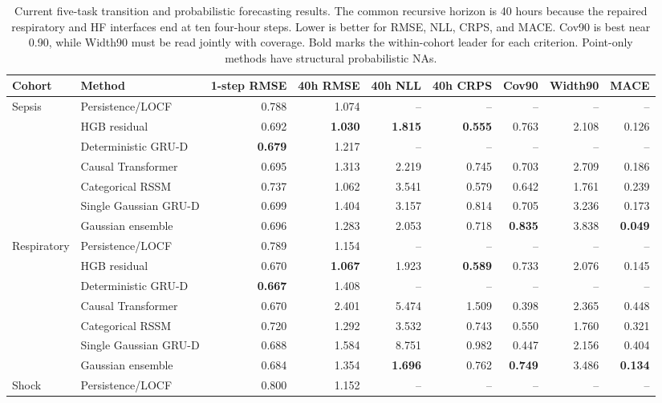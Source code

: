 \begin{table}[p]
\centering
\caption{Current five-task transition and probabilistic forecasting results. The common recursive horizon is 40 hours because the repaired respiratory and HF interfaces end at ten four-hour steps. Lower is better for RMSE, NLL, CRPS, and MACE. Cov90 is best near 0.90, while Width90 must be read jointly with coverage. Bold marks the within-cohort leader for each criterion. Point-only methods have structural probabilistic NAs.}
\label{tab:full-transition-uncertainty}
\scriptsize
\setlength{\tabcolsep}{3.6pt}
\begin{tabular}{llrrrrrrr}
\toprule
Cohort & Method & 1-step RMSE & 40h RMSE & 40h NLL & 40h CRPS & Cov90 & Width90 & MACE \\
\midrule
\multirow{7}{*}{Sepsis} & Persistence/LOCF & 0.788 & 1.074 & -- & -- & -- & -- & -- \\
 & HGB residual & 0.692 & \textbf{1.030} & \textbf{1.815} & \textbf{0.555} & 0.763 & 2.108 & 0.126 \\
 & Deterministic GRU-D & \textbf{0.679} & 1.217 & -- & -- & -- & -- & -- \\
 & Causal Transformer & 0.695 & 1.313 & 2.219 & 0.745 & 0.703 & 2.709 & 0.186 \\
 & Categorical RSSM & 0.737 & 1.062 & 3.541 & 0.579 & 0.642 & 1.761 & 0.239 \\
 & Single Gaussian GRU-D & 0.699 & 1.404 & 3.157 & 0.814 & 0.705 & 3.236 & 0.173 \\
 & Gaussian ensemble & 0.696 & 1.283 & 2.053 & 0.718 & \textbf{0.835} & 3.838 & \textbf{0.049} \\
\midrule
\multirow{7}{*}{Respiratory} & Persistence/LOCF & 0.789 & 1.154 & -- & -- & -- & -- & -- \\
 & HGB residual & 0.670 & \textbf{1.067} & 1.923 & \textbf{0.589} & 0.733 & 2.076 & 0.145 \\
 & Deterministic GRU-D & \textbf{0.667} & 1.408 & -- & -- & -- & -- & -- \\
 & Causal Transformer & 0.670 & 2.401 & 5.474 & 1.509 & 0.398 & 2.365 & 0.448 \\
 & Categorical RSSM & 0.720 & 1.292 & 3.532 & 0.743 & 0.550 & 1.760 & 0.321 \\
 & Single Gaussian GRU-D & 0.688 & 1.584 & 8.751 & 0.982 & 0.447 & 2.156 & 0.404 \\
 & Gaussian ensemble & 0.684 & 1.354 & \textbf{1.696} & 0.762 & \textbf{0.749} & 3.486 & \textbf{0.134} \\
\midrule
\multirow{7}{*}{Shock} & Persistence/LOCF & 0.800 & 1.152 & -- & -- & -- & -- & -- \\

\end{tabular}
\end{table}
